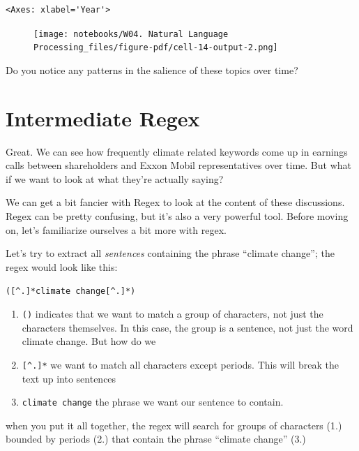 \documentclass[
  letterpaper,
  DIV=11,
  numbers=noendperiod]{scrreprt}
\providecommand{\tightlist}{%
  \setlength{\itemsep}{0pt}\setlength{\parskip}{0pt}}\usepackage{longtable,booktabs,array}
\begin{document}
\begin{verbatim}
<Axes: xlabel='Year'>
\end{verbatim}

\begin{figure}[H]

{\centering \texttt{[image: notebooks/W04. Natural Language Processing\_files/figure-pdf/cell-14-output-2.png]}

}

\end{figure}

Do you notice any patterns in the salience of these topics over time?

\hypertarget{intermediate-regex}{%
\section{Intermediate Regex}\label{intermediate-regex}}

Great. We can see how frequently climate related keywords come up in
earnings calls between shareholders and Exxon Mobil representatives over
time. But what if we want to look at what they're actually saying?

We can get a bit fancier with Regex to look at the content of these
discussions. Regex can be pretty confusing, but it's also a very
powerful tool. Before moving on, let's familiarize ourselves a bit more
with regex.

Let's try to extract all \emph{sentences} containing the phrase
``climate change''; the regex would look like this:

\texttt{({[}\^{}.{]}*climate\ change{[}\^{}.{]}*)}

\begin{enumerate}
\def\labelenumi{\arabic{enumi}.}
\tightlist
\item
  \texttt{()} indicates that we want to match a group of characters, not
  just the characters themselves. In this case, the group is a sentence,
  not just the word climate change. But how do we
\item
  \texttt{{[}\^{}.{]}*} we want to match all characters except periods.
  This will break the text up into sentences
\item
  \texttt{climate\ change} the phrase we want our sentence to contain.
\end{enumerate}

when you put it all together, the regex will search for groups of
characters (1.) bounded by periods (2.) that contain the phrase
``climate change'' (3.)
\end{document}

